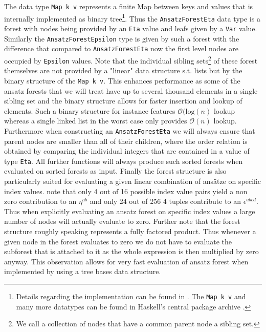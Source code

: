 \documentclass[a4paper,12pt, DIV=14, BCOR=5mm, twoside, headsepline]{scrbook}
\begin{document}
The data type \texttt{Map k v} represents a finite Map between keys and values that is internally implemented as binary tree\footnote{Details regarding the implementation can be found in \cite{adams_1993}. The \texttt{Map k v} \cite{HackageMap} and many more datatypes can be found in Haskell's central package archive \cite{Hackage}.}. Thus the \texttt{AnsatzForestEta} data type is a forest with nodes being provided by an \texttt{Eta} value and leafs given by a \texttt{Var} value. Similarly the \texttt{AnsatzForestEpsilon} type is given by such a forest with the difference that compared to \texttt{AnsatzForestEta} now the first level nodes are occupied by \texttt{Epsilon} values. Note that the individual sibling sets\footnote{We call a collection of nodes that have a common parent node a sibling set.} of these forest themselves are not provided by a "linear" data structure s.t. lists but by the binary structure of the \texttt{Map k v}. This enhances performance as some of the ansatz forests that we will treat have up to several thousand elements in a single sibling set and the binary structure allows for faster insertion and lookup of elements. Such a binary structure for instance features $\mathcal{O}(\mathrm{log}(n)$ lookup whereas a single linked list in the worst case only provides $\mathcal{O}(n)$ lookup. 
Furthermore when constructing an \texttt{AnsatzForestEta} we will always ensure that parent nodes are smaller than all of their children, where the order relation is obtained by comparing the individual integers that are contained in a value of type \texttt{Eta}. All further functions will always produce such sorted forests when evaluated on sorted forests as input. 
Finally the forest structure is also particularly suited for evaluating a given linear combination of ansätze on specific index values. note that only 4 out of 16 possible index value pairs yield a non zero contribution to an $\eta^{ab}$ and only 24 out of 256 4 tuples contribute to an $\epsilon^{abcd}$. Thus when explicitly evaluating an ansatz forest on specific index values a large number of nodes will actually evaluate to zero. Further note that the forest structure roughly speaking represents a fully factored product. Thus whenever a given node in the forest evaluates to zero we do not have to evaluate the subforest that is attached to it as the whole expression is then multiplied by zero anyway. This observation allows for very fast evaluation of ansatz forest when implemented by using a tree bases data structure. 
\end{document}
